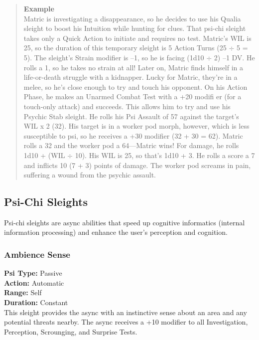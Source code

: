 \begin{quotation} \textbf{Example} \\ Matric is investigating a disappearance, so he decides to use his Qualia sleight to boost his Intuition while hunting for clues. That psi-chi sleight takes only a Quick Action to initiate and requires no test. Matric’s WIL is 25, so the duration of this temporary sleight is 5 Action Turns (25 $\div$ 5 = 5). The sleight’s Strain modifier is –1, so he is facing (1d10 $\div$ 2) –1 DV. He rolls a 1, so he takes no strain at all! Later on, Matric finds himself in a life-or-death struggle with a kidnapper. Lucky for Matric, they’re in a melee, so he’s close enough to try and touch his opponent. On his Action Phase, he makes an Unarmed Combat Test with a +20 modifi er (for a touch-only attack) and succeeds. This allows him to try and use his Psychic Stab sleight. He rolls his Psi Assault of 57 against the target’s WIL x 2 (32). His target is in a worker pod morph, however, which is less susceptible to psi, so he receives a +30 modifier (32 + 30 = 62). Matric rolls a 32 and the worker pod a 64—Matric wins! For damage, he rolls 1d10 + (WIL $\div$ 10). His WIL is 25, so that’s 1d10 + 3. He rolls a score a 7 and inflicts 10 (7 + 3) points of damage. The worker pod screams in pain, suffering a wound from the psychic assault. 

\end{quotation} 





\subsection{Psi-Chi Sleights} Psi-chi sleights are async abilities that speed up cognitive informatics (internal information processing) and enhance the user’s perception and cognition. 

\subsubsection{Ambience Sense} \textbf{Psi Type:} Passive \\ \textbf{Action:} Automatic \\ \textbf{Range:} Self \\ \textbf{Duration:} Constant \\ This sleight provides the async with an instinctive sense about an area and any potential threats nearby. The async receives a +10 modifier to all Investigation, Perception, Scrounging, and Surprise Tests. 

